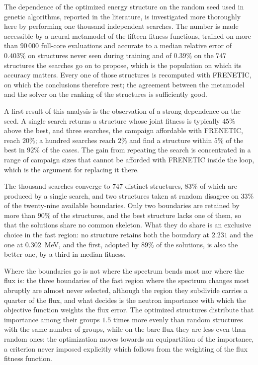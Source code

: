 The dependence of the optimized energy structure on the random seed used in
genetic algorithms, reported in the literature, is investigated more thoroughly
here by performing one thousand independent searches. The
number is made accessible by a neural metamodel of the fifteen fitness
functions, trained on more than $90\,000$ full-core evaluations and accurate to a
median relative error of $0.403\%$ on structures never seen during training and
of $0.39\%$ on the 747 structures the searches go on to propose, which is the
population on which its accuracy matters. Every one of those structures is
recomputed with FRENETIC, on which the conclusions therefore rest; the agreement
between the metamodel and the solver on the ranking of the structures is
sufficiently good.

A first result of this analysis is the observation of a strong dependence on the
seed. A single search returns a structure whose joint fitness is typically
$45\%$ above the best, and three searches, the campaign affordable with
FRENETIC, reach $20\%$; a hundred searches reach $2\%$
and find a structure within $5\%$ of the best in $92\%$ of the cases. The gain
from repeating the search is concentrated in a range of campaign sizes that
cannot be afforded with FRENETIC inside the loop, which is the argument for
replacing it there.

The thousand searches converge to 747
distinct structures, $83\%$ of which are produced by a single search, and two
structures taken at random disagree on $33\%$ of the twenty-nine available
boundaries. Only two boundaries are retained by more than $90\%$ of the
structures, and the best structure lacks one of them, so that the solutions
share no common skeleton. What they do share is an exclusive choice in the
fast region: no structure retains both the boundary at $2.231$ and the one at
$0.302$~MeV, and the first, adopted by $89\%$ of the solutions, is also the
better one, by a third in median fitness.

Where the boundaries go is not where the spectrum bends most nor where the flux
is: the three boundaries of the fast region where the spectrum changes most
abruptly are almost never selected, although the region they subdivide carries
a quarter of the flux, and what decides is the neutron importance with which the
objective function weights the flux error. The optimized
structures distribute that importance among their groups $1.5$ times more evenly
than random structures with the same number of groups, while on the bare flux
they are less even than random ones: the optimization moves towards an
equipartition of the importance, a criterion never imposed explicitly which
follows from the weighting of the flux fitness function.

